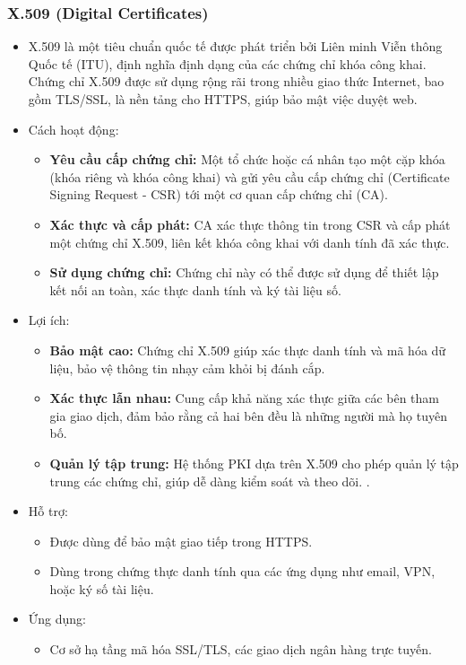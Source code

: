 \subsubsection{X.509 (Digital Certificates)}
\begin{itemize}
    \item X.509 là một tiêu chuẩn quốc tế được phát triển bởi Liên minh Viễn thông Quốc tế (ITU), định nghĩa định dạng của các chứng chỉ khóa công khai. Chứng chỉ X.509 được sử dụng rộng rãi trong nhiều giao thức Internet, bao gồm TLS/SSL, là nền tảng cho HTTPS, giúp bảo mật việc duyệt web.

    \item Cách hoạt động:
    \begin{itemize}
        \item \textbf{Yêu cầu cấp chứng chỉ:} Một tổ chức hoặc cá nhân tạo một cặp khóa (khóa riêng và khóa công khai) và gửi yêu cầu cấp chứng chỉ (Certificate Signing Request - CSR) tới một cơ quan cấp chứng chỉ (CA).

        \item \textbf{Xác thực và cấp phát:} CA xác thực thông tin trong CSR và cấp phát một chứng chỉ X.509, liên kết khóa công khai với danh tính đã xác thực.

        \item \textbf{Sử dụng chứng chỉ:} Chứng chỉ này có thể được sử dụng để thiết lập kết nối an toàn, xác thực danh tính và ký tài liệu số.
    \end{itemize}
    \item Lợi ích:
    \begin{itemize}
        \item \textbf{Bảo mật cao:} Chứng chỉ X.509 giúp xác thực danh tính và mã hóa dữ liệu, bảo vệ thông tin nhạy cảm khỏi bị đánh cắp.
        \item \textbf{Xác thực lẫn nhau:} Cung cấp khả năng xác thực giữa các bên tham gia giao dịch, đảm bảo rằng cả hai bên đều là những người mà họ tuyên bố.
        \item \textbf{Quản lý tập trung:} Hệ thống PKI dựa trên X.509 cho phép quản lý tập trung các chứng chỉ, giúp dễ dàng kiểm soát và theo dõi.
.
    \end{itemize}
    \item Hỗ trợ:
    \begin{itemize}
        \item Được dùng để bảo mật giao tiếp trong HTTPS.
        \item Dùng trong chứng thực danh tính qua các ứng dụng như email, VPN, hoặc ký số tài liệu.
    \end{itemize}
    \item Ứng dụng:
    \begin{itemize}
        \item Cơ sở hạ tầng mã hóa SSL/TLS, các giao dịch ngân hàng trực tuyến.
    \end{itemize}
\end{itemize}

